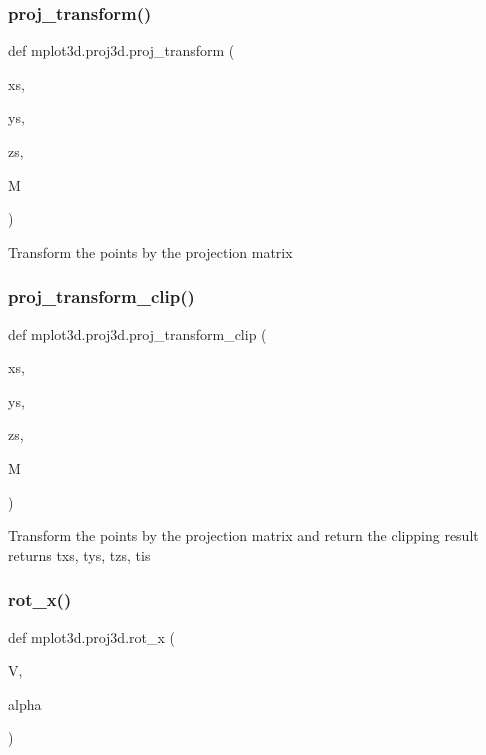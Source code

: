 \subsubsection{\texorpdfstring{proj\+\_\+transform()}{proj\_transform()}}
{\footnotesize\ttfamily def mplot3d.\+proj3d.\+proj\+\_\+transform (\begin{DoxyParamCaption}\item[{}]{xs,  }\item[{}]{ys,  }\item[{}]{zs,  }\item[{}]{M }\end{DoxyParamCaption})}

\begin{DoxyVerb}Transform the points by the projection matrix
\end{DoxyVerb}
 \mbox{\label{namespacemplot3d_1_1proj3d_af5fe5a4a5fbffdfcd581d58ce977eb41}} 
\subsubsection{\texorpdfstring{proj\+\_\+transform\+\_\+clip()}{proj\_transform\_clip()}}
{\footnotesize\ttfamily def mplot3d.\+proj3d.\+proj\+\_\+transform\+\_\+clip (\begin{DoxyParamCaption}\item[{}]{xs,  }\item[{}]{ys,  }\item[{}]{zs,  }\item[{}]{M }\end{DoxyParamCaption})}

\begin{DoxyVerb}Transform the points by the projection matrix
and return the clipping result
returns txs, tys, tzs, tis
\end{DoxyVerb}
 \mbox{\label{namespacemplot3d_1_1proj3d_a8f39e24cd1fed69169deab559e1e628e}} 
\subsubsection{\texorpdfstring{rot\+\_\+x()}{rot\_x()}}
{\footnotesize\ttfamily def mplot3d.\+proj3d.\+rot\+\_\+x (\begin{DoxyParamCaption}\item[{}]{V,  }\item[{}]{alpha }\end{DoxyParamCaption})}

